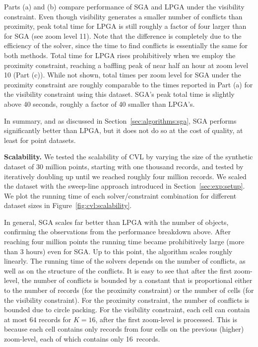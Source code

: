 \documentclass[11pt, oneside]{report}
\newcommand{\minisec}[1]{\noindent\textbf{#1.}}
\begin{document}
{Parts (a) and (b) compare performance of SGA and LPGA under the visibility constraint. Even though visibility generates a smaller number of conflicts than proximity, peak total time for LPGA is still roughly a factor of four larger than for SGA (see zoom level 11). Note that the difference is completely due to the efficiency of the solver, since the time to find conflicts is essentially the same for both methods. Total time for LPGA rises prohibitively when we employ the proximity constraint, reaching a baffling peak of near half an hour at zoom level 10 (Part (c)). While not shown, total times per zoom level for SGA under the proximity constraint are roughly comparable to the times reported in Part (a) for the visibility constraint using this dataset. SGA's peak total time is slightly above 40 seconds, roughly a factor of 40 smaller than LPGA's.         

In summary, and as discussed in Section~\ref{sec:algorithms:sga}, SGA performs significantly better than LPGA, but it does not do so at the cost of quality, at least for point datasets.


\minisec{Scalability}
We tested the scalability of CVL by varying the size of the synthetic dataset of 30 million points, starting with one thousand records, and tested by iteratively doubling up until we reached roughly four million records. We scaled the dataset with the sweep-line approach introduced in Section~\ref{sec:exp:setup}. We plot the running time of each solver/constraint combination for different dataset sizes in Figure~\ref{fig:cvl:scalability}.

In general, SGA scales far better than LPGA with the number of objects, confirming the observations from the performance breakdown above. After reaching four million points the running time became prohibitively large (more than 3 hours) even for SGA. Up to this point, the algorithm scales roughly linearly. The running time of the solvers depends on the number of conflicts, as well as on the structure of the conflicts. It is easy to see that after the first zoom-level, the number of conflicts is bounded by a constant that is proportional either to the number of records (for the proximity constraint) or the number of cells (for the visibility constraint). For the proximity constraint, the number of conflicts is bounded due to circle packing. For the visibility constraint, each cell can contain at most $64$ records for $K=16$, after the first zoom-level is processed. This is because each cell contains only records from four cells on the previous (higher) zoom-level, each of which contains only 16~records.

}
\end{document}
